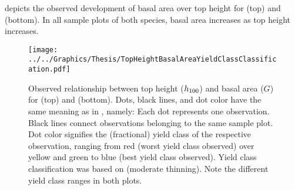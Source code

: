  depicts the observed development of basal area over top height for \Beech{} (top) and \Spruce{} (bottom).  In all sample plots of both species, basal area increases as top height increases.

\begin{figure}[t]
  \texttt{[image: ../../Graphics/Thesis/TopHeightBasalAreaYieldClassClassification.pdf]}
  \caption{Observed relationship between top height (\(h_{100}{}\)) and basal area (\(G\)) for \Beech{} (top) and \Spruce{} (bottom).  Dots, black lines, and dot color have the same meaning as in , namely:  Each dot represents one observation.  Black lines connect observations belonging to the same sample plot.  Dot color signifies the (fractional) yield class of the respective observation, ranging from red (worst yield class observed) over yellow and green to blue (best yield class observed). Yield class classification was based on \textcite{Schober1995} (moderate thinning).  Note the different yield class ranges in both plots.}
  \label{fig:TopHeightBasalAreaYieldClassClassification}
\end{figure}


